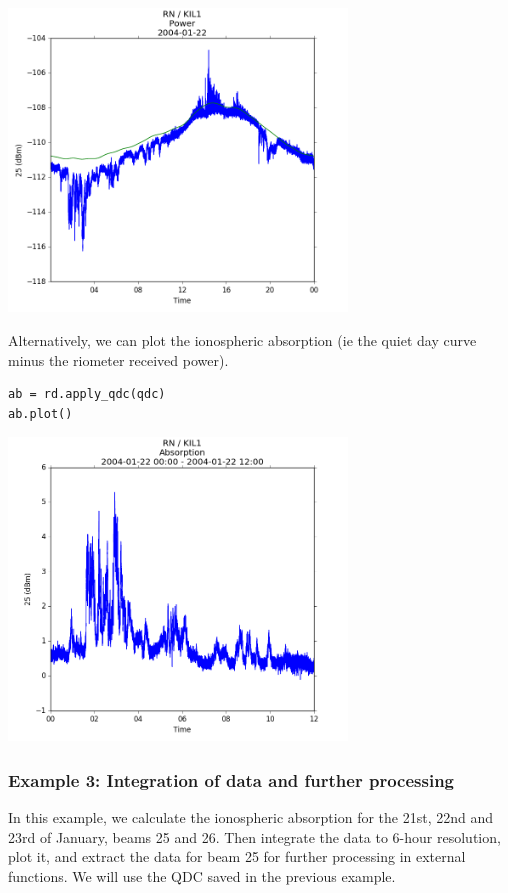 \documentclass{article}
\begin{document}
\includegraphics[width=9cm]{images/figure_4.png}


\noindent Alternatively, we can plot the ionospheric absorption (ie the quiet day curve minus the riometer received power).
\begin{lstlisting}[style=pythonstyle]
ab = rd.apply_qdc(qdc)
ab.plot()
\end{lstlisting}

\includegraphics[width=9cm]{images/figure_5.png}

\subsubsection{Example 3: Integration of data and further processing}

In this example, we calculate the ionospheric absorption for the 21st, 22nd and 23rd of January, beams 25 and 26. Then integrate the data to 6-hour resolution, plot it, and extract the data for beam 25 for further processing in external functions. We will use the QDC saved in the previous example.
\end{document}
